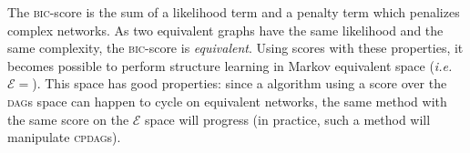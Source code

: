 \vspace*{-\baselineskip}
\vspace{\baselineskip}

The \textsc{bic}-score is the sum of a likelihood term and a penalty term which penalizes complex networks.
As two equivalent graphs have the same likelihood and the same complexity, the \textsc{bic}-score is \emph{equivalent}.
Using scores with these properties, it becomes possible to perform structure learning in Markov equivalent space (\emph{i.e.} $\mathcal{E} = $\Large{}\normalsize). This space has good properties: since a algorithm using a score over the \textsc{dag}s space can happen to cycle on equivalent networks, the same method with the same score on the $\mathcal{E}$ space will progress (in practice, such a method will manipulate \textsc{cpdag}s).


